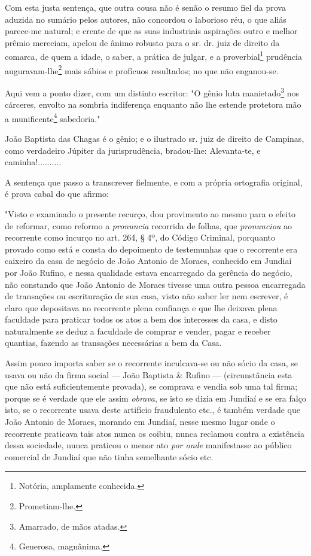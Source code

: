 \asterisc

Com esta justa sentença, que outra cousa não é senão o resumo fiel da
prova aduzida no sumário pelos autores, não concordou o laborioso réu, o
que aliás parece-me natural; e crente de que as suas industriais
aspirações outro e melhor prêmio mereciam, apelou de ânimo robusto para
o sr. dr. juiz de direito da comarca, de quem a idade, o saber, a
prática de julgar, e a proverbial\footnote{Notória, amplamente
  conhecida.} prudência auguravam-lhe\footnote{Prometiam-lhe.} mais
sábios e profícuos resultados; no que não enganou-se.

Aqui vem a ponto dizer, com um distinto escritor: "O gênio luta
manietado\footnote{Amarrado, de mãos atadas.} nos cárceres, envolto na
sombria indiferença enquanto não lhe estende protetora mão a
munificente\footnote{Generosa, magnânima.} sabedoria."

João Baptista das Chagas é o gênio; e o ilustrado sr. juiz de direito de
Campinas, como verdadeiro Júpiter da jurisprudência, bradou-lhe:
Alevanta-te, e caminha!..........

A sentença que passo a transcrever fielmente, e com a própria ortografia
original, é prova cabal do que afirmo:

"Visto e examinado o presente recurço, dou provimento ao mesmo para o
efeito de reformar, como reformo a \emph{pronuncia} recorrida de folhas,
que \emph{pronunciou} ao recorrente como incurço no art. 264, § 4º, do
Código Criminal, porquanto provado como está e consta do depoimento de
testemunhas que o recorrente era caixeiro da casa de negócio de João
Antonio de Moraes, conhecido em Jundiaí por João Rufino, e nessa
qualidade estava encarregado da gerência do negócio, não constando que
João Antonio de Moraes tivesse uma outra pessoa encarregada de
transações ou escrituração de sua casa, visto não saber ler nem
escrever, é claro que depositava no recorrente plena confiança e que lhe
deixava plena faculdade para praticar todos os atos a bem dos interesses
da casa, e disto naturalmente se deduz a faculdade de comprar e vender,
pagar e receber quantias, fazendo as transações necessárias a bem da
Casa.

Assim pouco importa saber se o recorrente inculcava-se ou não sócio da
casa, se usava ou não da firma social --- João Baptista \& Rufino ---
(circunstância esta que não está suficientemente provada), se comprava e
vendia sob uma tal firma; porque se é verdade que ele assim
\emph{obrava}, se isto se dizia em Jundiaí e se era falço isto, se o
recorrente usava deste artifício fraudulento etc., é também verdade que
João Antonio de Moraes, morando em Jundiaí, nesse mesmo lugar onde o
recorrente praticava tais atos nunca os coibiu, nunca reclamou contra a
existência dessa sociedade, nunca praticou o menor ato \emph{por onde}
manifestasse ao público comercial de Jundiaí que não tinha semelhante
sócio etc.

